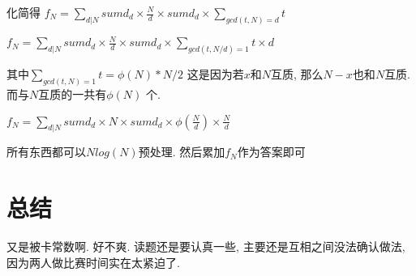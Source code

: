 \documentclass[a4paper, 11pt, nofonts, nocap, fancyhdr]{ctexart}
\begin{document}
化简得 $f_N = \sum\limits_{d|N} sumd_d \times \frac{N}{d} \times sumd_d \times \sum\limits_{gcd(t, N) = d} t$

$f_N = \sum\limits_{d|N} sumd_d \times \frac{N}{d} \times sumd_d \times \sum\limits_{gcd(t, N/d) = 1} t \times d$

其中$\sum\limits_{gcd(t, N) = 1} t = \phi(N)*N/2$ 这是因为若$x$和$N$互质, 那么$N-x$也和$N$互质. 而与$N$互质的一共有$\phi(N)$ 个.

$f_N = \sum\limits_{d|N} sumd_d \times N \times sumd_d \times \phi(\frac{N}{d}) \times \frac{N}{d}$

所有东西都可以$Nlog(N)$预处理. 然后累加$f_N$作为答案即可

\section{总结}

又是被卡常数啊. 好不爽. 读题还是要认真一些, 主要还是互相之间没法确认做法, 因为两人做比赛时间实在太紧迫了.
\end{document}
